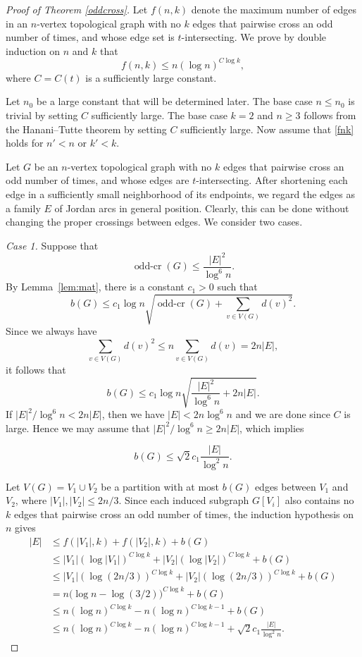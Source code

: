 \documentclass[11pt]{article}
\theoremstyle{plain}
\theoremstyle{definition}
\theoremstyle{remark}
\begin{document}
\begin{proof}[Proof of Theorem \ref{oddcross}]
Let \(f(n,k)\) denote the maximum number of edges in an \(n\)-vertex topological graph with no \(k\) edges that pairwise cross an odd number of times, and whose edge set is \(t\)-intersecting. We prove by double induction on \(n\) and \(k\) that
\begin{equation}\label{fnk}
    f(n,k)\le n(\log n)^{C\log k},
\end{equation}
where \(C=C(t)\) is a sufficiently large constant.

Let $n_0$ be a large constant that will be determined later.  The base case \(n\leq n_0\) is trivial by setting $C$ sufficiently large. The base case \(k=2\) and $n \geq 3$ follows from the Hanani--Tutte theorem by setting  \(C\) sufficiently large. Now assume that \eqref{fnk} holds for  \(n'<n\) or \(k'<k\).

Let \(G\) be an \(n\)-vertex topological graph with no \(k\) edges that
pairwise cross an odd number of times, and whose edges are \(t\)-intersecting.
After shortening each edge in a sufficiently small neighborhood of its
endpoints, we regard the edges as a family \(E\) of Jordan arcs in general
position. Clearly, this can be done without changing the proper crossings
between edges. We consider two cases.

 

\medskip

\noindent \emph{Case 1.} Suppose that
\[
\operatorname{odd\text{-}cr}(G)\le \frac{|E|^2}{\log^6 n}.
\]
By Lemma~\ref{lem:mat}, there is a constant $c_1 > 0$ such that
\[
b(G)\le c_1\log n\sqrt{\operatorname{odd\text{-}cr}(G)+\sum_{v\in V(G)}d(v)^2}.
\]
Since we always have
\[
\sum_{v\in V(G)}d(v)^2\le n\sum_{v\in V(G)}d(v)=2n|E|,
\]
it follows that
\[
b(G)\le c_1\log n\sqrt{\frac{|E|^2}{\log^6 n}+2n|E|}.
\]
If $|E|^2/\log^6 n<2n|E|$, then we have $|E|<2n\log^6 n$ and we are done since $C$ is large.   Hence we may assume that $|E|^2/\log^6 n \geq2n|E|$, which implies
 
\[
b(G)\le \sqrt{2}c_1\frac{|E|}{\log^2 n}.
\]

Let \(V(G)=V_1\cup V_2\) be a partition with at most \(b(G)\) edges between \(V_1\) and \(V_2\), where \(|V_1|,|V_2|\le 2n/3\). Since each induced subgraph \(G[V_i]\) also contains no \(k\) edges that pairwise cross an odd number of times, the induction hypothesis on \(n\) gives
\begin{align*}
|E|
    &\le f(|V_1|,k)+f(|V_2|,k)+b(G) \\
    &\le |V_1|(\log |V_1|)^{C\log k}
        + |V_2|(\log |V_2|)^{C\log k}
        + b(G) \\
    &\le |V_1|(\log (2n/3))^{C\log k}
        + |V_2|(\log (2n/3))^{C\log k}
        + b(G) \\
    &= n\bigl(\log n-\log(3/2)\bigr)^{C\log k}+b(G) \\
    &\le n(\log n)^{C\log k}-n(\log n)^{C\log k-1}+b(G) \\
    &\le n(\log n)^{C\log k}-n(\log n)^{C\log k-1}
        +\sqrt{2}c_1\frac{|E|}{\log^2 n}.
\end{align*}








\end{proof}
\end{document}
